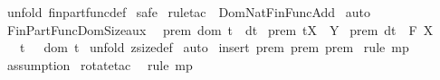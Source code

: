 \begin{isabellebody}
%
\isadelimproof
%
\endisadelimproof
%
\isatagproof
{}\isamarkupfalse%
\ {\isacharparenleft}unfold\ fin{\isacharunderscore}part{\isacharunderscore}func{\isacharunderscore}def{\isacharparenright}\isanewline
{}\isamarkupfalse%
\ safe\isanewline
{}\isamarkupfalse%
\ {\isacharparenleft}rule{\isacharunderscore}tac\ {\isacharbrackleft}{}{\isacharbrackright}\ Dom{\isacharunderscore}Nat{\isacharunderscore}Fin{\isacharunderscore}Func{\isacharunderscore}Add{\isacharparenright}\isanewline
{}\isamarkupfalse%
\ auto\isanewline
{}\isamarkupfalse%
%
\endisatagproof
{\isafoldproof}%
%
\isadelimproof
\isanewline
%
\endisadelimproof
\ \isanewline
\isanewline
\isanewline
{}\isamarkupfalse%
\ Fin{\isacharunderscore}Part{\isacharunderscore}Func{\isacharunderscore}Dom{\isacharunderscore}Size{\isacharunderscore}aux{\isacharcolon}\ \isanewline
{}\ prem{}{\isacharcolon}\ {\isachardoublequoteopen}{\isacharparenleft}dom\ t{\isacharparenright}\ {\isacharequal}\ dt{\isachardoublequoteclose}\isanewline
{}\ prem{}{\isacharcolon}\ {\isachardoublequoteopen}t{\isacharcolon}{\isacharparenleft}X\ {\isacharminus}{\isacharbar}{\isacharminus}{\isachargreater}\ Y{\isacharparenright}{\isachardoublequoteclose}\isanewline
{}\ prem{}{\isacharcolon}\ {\isachardoublequoteopen}dt\ {\isacharcolon}\ {\isacharpercent}F\ X{\isachardoublequoteclose}\isanewline
{}\ {\isachardoublequoteopen}\ {\isacharhash}\ t\ {\isacharequal}\ {\isacharhash}\ {\isacharparenleft}dom\ t{\isacharparenright}{\isachardoublequoteclose}\isanewline
%
\isadelimproof
%
\endisadelimproof
%
\isatagproof
{}\isamarkupfalse%
\ {\isacharparenleft}unfold\ zsize{\isacharunderscore}def{\isacharparenright}\isanewline
{}\isamarkupfalse%
\ auto\isanewline
{}\isamarkupfalse%
\ {\isacharparenleft}insert\ prem{}\ prem{}\ prem{}{\isacharparenright}\isanewline
{}\isamarkupfalse%
\ {\isacharparenleft}rule\ mp{\isacharparenright}\isanewline
{}\isamarkupfalse%
\ {}\ \isanewline
{}\isamarkupfalse%
\ {\isacharparenleft}assumption{\isacharparenright}\isanewline
{}\isamarkupfalse%
\ {\isacharparenleft}rotate{\isacharunderscore}tac\ {}{\isacharparenright}\isanewline
{}\isamarkupfalse%
\ {\isacharparenleft}rule\ mp{\isacharparenright}\isanewline
{}\isamarkupfalse%

\end{isabellebody}
